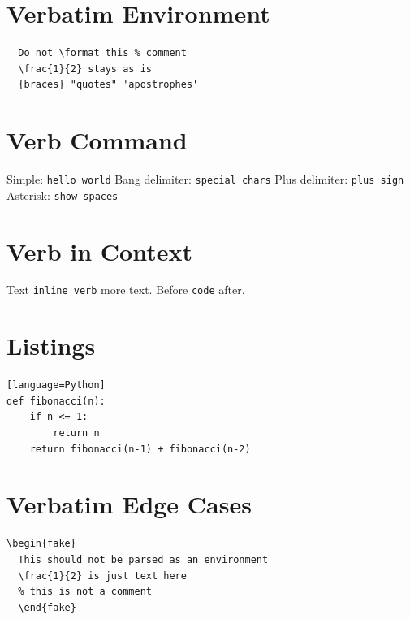 \documentclass{article}
\begin{document}
\section{Verbatim Environment}
\begin{verbatim}
  Do not \format this % comment
  \frac{1}{2} stays as is
  {braces} "quotes" 'apostrophes'
\end{verbatim}

\section{Verb Command}
Simple: \verb|hello world|
Bang delimiter: \verb!special chars!
Plus delimiter: \verb+plus sign+
Asterisk: \verb*|show spaces|

\section{Verb in Context}
Text \verb|inline verb| more text.
Before \verb|code| after.

\section{Listings}
\begin{lstlisting}
[language=Python]
def fibonacci(n):
    if n <= 1:
        return n
    return fibonacci(n-1) + fibonacci(n-2)
\end{lstlisting}

\section{Verbatim Edge Cases}
\begin{verbatim}
\begin{fake}
  This should not be parsed as an environment
  \frac{1}{2} is just text here
  % this is not a comment
  \end{fake}
\end{verbatim}
\end{document}
